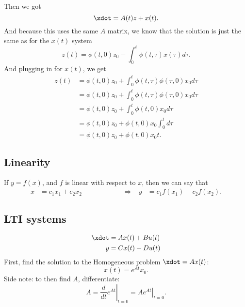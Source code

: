 \documentclass[10pt]{article}
\begin{document}
Then we got
\begin{equation*}
  \zdot = A(t)z + x(t).
\end{equation*}
And because this uses the same $A$ matrix, we know that the solution
is just the same as for the $x(t)$ system
\begin{equation*}
  z(t) = \phi(t,0)z_0 + \int_0^t\phi(t,\tau)x(\tau)d\tau.
\end{equation*}
And plugging in for $x(t)$, we get
\begin{equation*}
  \begin{split}
    z(t) &= \phi(t,0)z_0 + \int_0^t\phi(t,\tau)\phi(\tau,0)x_0d\tau \\
    &= \phi(t,0)z_0 + \int_0^t\phi(t,\tau)\phi(\tau,0)x_0d\tau\\
    &= \phi(t,0)z_0 + \int_0^t\phi(t,0)x_0d\tau\\
    &= \phi(t,0)z_0 + \phi(t,0)x_0\int_0^td\tau\\
    &= \phi(t,0)z_0 + \phi(t,0)x_0t.
  \end{split}
\end{equation*}

\subsection{Linearity}

If $y = f(x)$, and $f$ is linear with respect to $x$, then we can say
that 
\begin{align*}
  x &= c_1x_1 + c_2x_2 \qquad \qquad\qquad \Rightarrow  & y &= c_1f(x_1) + c_2f(x_2).
\end{align*}

\subsection{LTI systems}
\begin{equation*}
  \begin{split}
    \xdot &= Ax(t) + Bu(t) \\
    y  &= Cx(t) + Du(t)
  \end{split}
\end{equation*}
First, find the solution to the Homogeneous problem $\xdot = Ax(t)$:
\begin{equation*}
  x(t) = e^{At}x_0.
\end{equation*}
Side note: to then find $A$, differentiate:
\begin{equation*}
  A = \left.\frac{d}{dt} e^{At}\right|_{t=0} = \left.Ae^{At}\right|_{t=0}.
\end{equation*}
\end{document}
